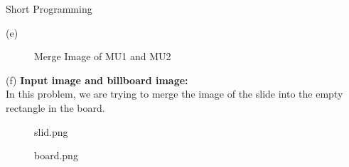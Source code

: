 \documentclass[a4paper,12pt]{article}
\begin{document}
\begin{section}{Short Programming}
\begin{subsection}{(e)}
\begin{figure}[!htb]
        \caption{Merge Image of MU1 and MU2}
      \end{figure}
      


\end{subsection}
\clearpage
\begin{subsection}{(f)}
\textbf{Input image and billboard image:}\\

In this problem, we are trying to merge the image of the slide into the empty rectangle in the board.\\
\begin{figure}[!htb]
        \caption{slid.png}
      \end{figure}
      
      \begin{figure}[!htb]
        \caption{board.png}
      \end{figure}
      

\end{subsection}
\end{section}
\end{document}
